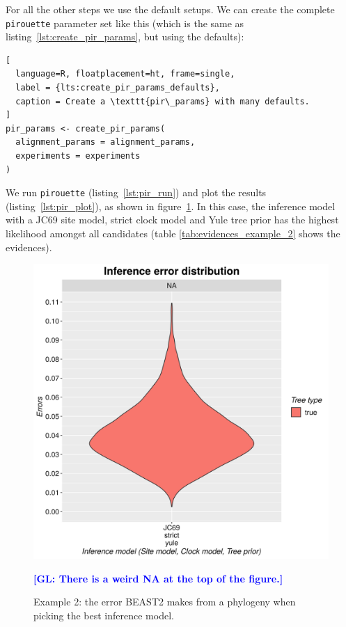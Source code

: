 \documentclass{article}
\newcommand{\giovanni}[1]{\textcolor{blue}{\textbf{[GL: #1]}}}
\begin{document}
For all the other steps we use the default setups. 
We can create the complete
\verb;pirouette; parameter set like this (which is the
same as listing~\ref{lst:create_pir_params}, but using the defaults):

\begin{lstlisting}[
  language=R, floatplacement=ht, frame=single,
  label = {lts:create_pir_params_defaults},
  caption = Create a \texttt{pir\_params} with many defaults.
]
pir_params <- create_pir_params(
  alignment_params = alignment_params,
  experiments = experiments
)
\end{lstlisting}

We run \verb;pirouette; (listing~\ref{lst:pir_run}) 
and plot the results (listing~\ref{lst:pir_plot}),
as shown in figure~\ref{fig:example_2}.
In this case, the inference model with a JC69 site model, 
strict clock model and Yule tree prior has the highest likelihood
amongst all candidates (table \ref{tab:evidences_example_2} shows
the evidences).

\begin{figure}[ht]
  \includegraphics[width=\textwidth]{example_2/errors.png}
  \caption{
    Example 2: the error BEAST2 makes from a phylogeny when
    picking the best inference model.
  }
  \label{fig:example_2}
  \giovanni{There is a weird NA at the top of the figure.}
\end{figure}
\end{document}
